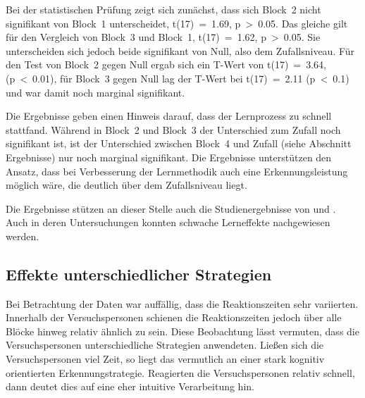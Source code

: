 \documentclass[doc,a4paper,12pt]{apa6}
\begin{document}
Bei der statistischen Prüfung zeigt sich zunächst, dass sich Block~2 nicht signifikant von Block~1 unterscheidet, t(17)~=~1.69, p~>~0.05. Das gleiche gilt für den Vergleich von Block~3 und Block~1, t(17)~=~1.62, p~>~0.05. Sie unterscheiden sich jedoch beide signifikant von Null, also dem Zufallsniveau. Für den Test von Block~2 gegen Null ergab sich ein T-Wert von t(17)~=~3.64, (p~<~0.01), für Block~3 gegen Null lag der T-Wert bei t(17)~=~2.11 (p~<~0.1) und war damit noch marginal signifikant.

Die Ergebnisse geben einen Hinweis darauf, dass der Lernprozess zu schnell stattfand. Während in Block~2 und Block~3 der Unterschied zum Zufall noch signifikant ist, ist der Unterschied zwischen Block~4 und Zufall (siehe Abschnitt Ergebnisse) nur noch marginal signifikant. Die Ergebnisse unterstützen den Ansatz, dass bei Verbesserung der Lernmethodik auch eine Erkennungsleistung möglich wäre, die deutlich über dem Zufallsniveau liegt.

Die Ergebnisse stützen an dieser Stelle auch die Studienergebnisse von \textcite{paavilainen2007preattentive} und \textcite{bendixen2008rapid}. Auch in deren Untersuchungen konnten schwache Lerneffekte nachgewiesen werden.

\subsection{Effekte unterschiedlicher Strategien}

Bei Betrachtung der Daten war auffällig, dass die Reaktionszeiten sehr variierten. Innerhalb der Versuchspersonen schienen die Reaktionszeiten jedoch über alle Blöcke hinweg relativ ähnlich zu sein. Diese Beobachtung lässt vermuten, dass die Versuchspersonen unterschiedliche Strategien anwendeten. Ließen sich die Versuchspersonen viel Zeit, so liegt das vermutlich an einer stark kognitiv orientierten Erkennungstrategie. Reagierten die Versuchspersonen relativ schnell, dann deutet dies auf eine eher intuitive Verarbeitung hin.
\end{document}
